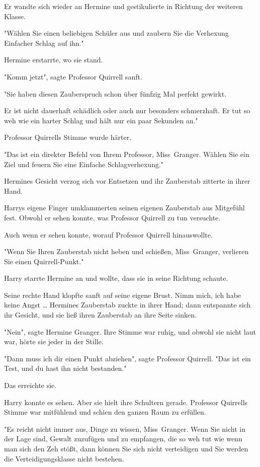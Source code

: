 {Er wandte sich wieder an Hermine und gestikulierte in Richtung der weiteren Klasse.

"Wählen Sie einen beliebigen Schüler aus und zaubern Sie die Verhexung Einfacher Schlag auf ihn."

Hermine erstarrte, wo sie stand.

"Komm jetzt", sagte Professor Quirrell sanft.

"Sie haben diesen Zauberspruch schon über fünfzig Mal perfekt gewirkt.

Er ist nicht dauerhaft schädlich oder auch nur besonders schmerzhaft. Er tut so weh wie ein harter Schlag und hält nur ein paar Sekunden an."

Professor Quirrells Stimme wurde härter.

"Das ist ein direkter Befehl von Ihrem Professor, Miss~Granger. Wählen Sie ein Ziel und feuern Sie eine Einfache Schlagverhexung."

Hermines Gesicht verzog sich vor Entsetzen und ihr Zauberstab zitterte in ihrer Hand.

Harrys eigene Finger umklammerten seinen eigenen Zauberstab aus Mitgefühl fest. Obwohl er sehen konnte, was Professor Quirrell zu tun versuchte.

Auch wenn er sehen konnte, worauf Professor Quirrell hinauswollte.

"Wenn Sie Ihren Zauberstab nicht heben und schießen, Miss~Granger, verlieren Sie einen Quirrell-Punkt."

Harry starrte Hermine an und wollte, dass sie in seine Richtung schaute.

Seine rechte Hand klopfte sanft auf seine eigene Brust. Nimm mich, ich habe keine Angst … Hermines Zauberstab zuckte in ihrer Hand; dann entspannte sich ihr Gesicht, und sie ließ ihren Zauberstab an ihre Seite sinken.

"Nein", sagte Hermine Granger. Ihre Stimme war ruhig, und obwohl sie nicht laut war, hörte sie jeder in der Stille.

"Dann muss ich dir einen Punkt abziehen", sagte Professor Quirrell. "Das ist ein Test, und du hast ihn nicht bestanden."

Das erreichte sie.

Harry konnte es sehen. Aber sie hielt ihre Schultern gerade. Professor Quirrells Stimme war mitfühlend und schien den ganzen Raum zu erfüllen.

"Es reicht nicht immer aus, Dinge zu wissen, Miss~Granger. Wenn Sie nicht in der Lage sind, Gewalt zuzufügen und zu empfangen, die so weh tut wie wenn man sich den Zeh stößt, dann können Sie sich nicht verteidigen und Sie werden die Verteidigungsklasse nicht bestehen.

}
